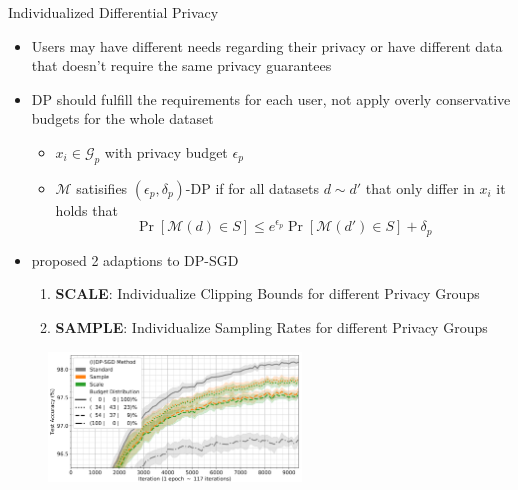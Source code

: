 \documentclass[aspectratio=169]{beamer}
\begin{document}
\begin{frame}{Individualized Differential Privacy}
    \begin{itemize}
        \item Users may have different needs regarding their privacy or have different data that doesn't require the same privacy guarantees
        \item DP should fulfill the requirements for each user, not apply overly conservative budgets for the whole dataset \parencite{boenisch:2023}
        \begin{itemize}
            \item $x_i \in \mathcal{G}_p$ with privacy budget $\epsilon_p$
            \item $\mathcal{M}$ satisifies $(\epsilon_p, \delta_p)$-DP if for all datasets $d \sim{} d'$ that only differ in $x_i$ it holds that
            $$\Pr[\mathcal{M}(d) \in S] \leq e^{\epsilon_p} \Pr[\mathcal{M}(d') \in S] + \delta_p$$
        \end{itemize}
    \end{itemize}
\end{frame}

\begin{frame}
    \begin{itemize}
        \item \cite{boenisch:2023} proposed 2 adaptions to DP-SGD
        \begin{enumerate}
            \item \textbf{SCALE}: Individualize Clipping Bounds for different Privacy Groups
            \item \textbf{SAMPLE}: Individualize Sampling Rates for different Privacy Groups
        \end{enumerate}
    \end{itemize}
    \begin{figure}[tb]
        \centering
        \includegraphics[width=0.6\textwidth]{Graphics/boehnisch_sample_vs_scale.png}
        \label{fig:design_principles_dpml_2}
    \end{figure}
\end{frame}
\end{document}
